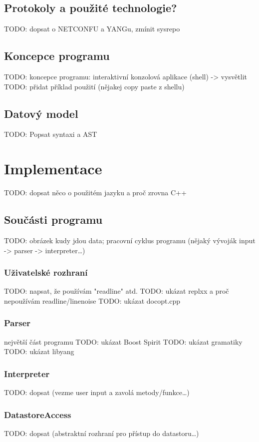 \documentclass[thesis=B,czech]{FITthesis}[2019/03/06]
\begin{document}
\section{Protokoly a použité technologie?}
TODO: dopsat o NETCONFU a YANGu, zmínit sysrepo

\section{Koncepce programu}
TODO: koncepce programu: interaktivní konzolová aplikace (shell) -> vysvětlit
TODO: přidat příklad použití (nějakej copy paste z shellu)

\section{Datový model}
TODO: Popsat syntaxi a AST


\chapter{Implementace}
TODO: dopsat něco o použitém jazyku a proč zrovna C++

\section{Součásti programu}
TODO: obrázek kudy jdou data; pracovní cyklus programu (nějaký vývoják input -> parser -> interpreter\ldots)

\subsection{Uživatelské rozhraní}
TODO: napsat, že používám "readline" atd.
TODO: ukázat replxx a proč nepoužívám readline/linenoise
TODO: ukázat docopt.cpp

\subsection{Parser}
největší část programu
TODO: ukázat Boost Spirit
TODO: ukázat gramatiky
TODO: ukázat libyang

\subsection{Interpreter}
TODO: dopsat (vezme user input a zavolá metody/funkce\ldots)

\subsection{DatastoreAccess}
TODO: dopsat (abstraktní rozhraní pro přístup do datastoru\ldots)
\end{document}
